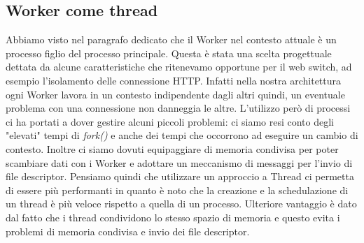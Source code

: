 \documentclass[italian]{tktltiki2}
\begin{document}
\subsection{Worker come thread}
Abbiamo visto nel paragrafo dedicato che il Worker nel contesto attuale è un processo figlio del processo principale. Questa è stata una scelta progettuale dettata da alcune caratteristiche che ritenevamo opportune per il web switch, ad esempio l'isolamento delle connessione HTTP. Infatti nella nostra architettura ogni Worker lavora in un contesto indipendente dagli altri quindi, un eventuale problema con una connessione non danneggia le altre. L'utilizzo però di processi ci ha portati a dover gestire alcuni piccoli problemi: ci siamo resi conto degli "elevati" tempi di \emph{fork()} e anche dei tempi che occorrono ad eseguire un cambio di contesto. Inoltre ci siamo dovuti equipaggiare di memoria condivisa per poter scambiare dati con i Worker e adottare un meccanismo di messaggi per l'invio di file descriptor. Pensiamo quindi che utilizzare un approccio a Thread ci permetta di essere più performanti in quanto è noto che la creazione e la schedulazione di un thread è più veloce rispetto a quella di un processo. Ulteriore vantaggio è dato dal fatto che i thread condividono lo stesso spazio di memoria e questo evita i problemi di memoria condivisa e invio dei file descriptor.

%
%
% 
%
\end{document}
